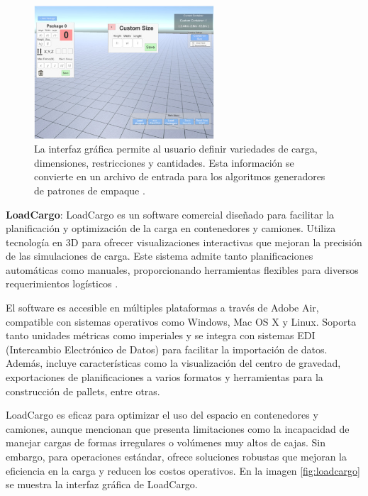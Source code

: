 \documentclass[openany]{article}
\begin{document}
\begin{figure}[H]
    \centering
    \includegraphics[width=0.6\textwidth]{Figures/packagecargo.jpg}
    \caption{La interfaz gráfica permite al usuario definir variedades de carga, dimensiones, restricciones y cantidades. Esta información se convierte en un archivo de entrada para los algoritmos generadores de patrones de empaque \parencite{MARTINEZFRANCO2020100601}.}
    \label{fig:packagecargo}
\end{figure}


\textbf{LoadCargo}: LoadCargo es un software comercial diseñado para facilitar la planificación y optimización de la carga en contenedores y camiones. Utiliza tecnología en 3D para ofrecer visualizaciones interactivas que mejoran la precisión de las simulaciones de carga. Este sistema admite tanto planificaciones automáticas como manuales, proporcionando herramientas flexibles para diversos requerimientos logísticos \parencite{loadcargo2024}.

El software es accesible en múltiples plataformas a través de Adobe Air, compatible con sistemas operativos como Windows, Mac OS X y Linux. Soporta tanto unidades métricas como imperiales y se integra con sistemas EDI (Intercambio Electrónico de Datos) para facilitar la importación de datos. Además, incluye características como la visualización del centro de gravedad, exportaciones de planificaciones a varios formatos y herramientas para la construcción de pallets, entre otras.

LoadCargo es eficaz para optimizar el uso del espacio en contenedores y camiones, aunque mencionan que presenta limitaciones como la incapacidad de manejar cargas de formas irregulares o volúmenes muy altos de cajas. Sin embargo, para operaciones estándar, ofrece soluciones robustas que mejoran la eficiencia en la carga y reducen los costos operativos. En la imagen \ref{fig:loadcargo} se muestra la interfaz gráfica de LoadCargo.
\end{document}
